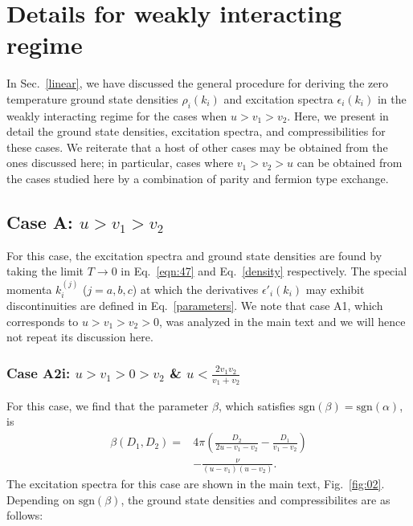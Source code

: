 \documentclass[aps,pra,
superscriptaddress,
reprint,twocolumn,preprintnumbers,
amsmath,amssymb,
nofootinbib]{revtex4-1}
\begin{document}
	 
	\section{Details for weakly interacting regime}
	\label{app:D}
	
In Sec.~\ref{linear}, we have discussed the general procedure for deriving the zero temperature ground state densities $\rho_i(k_i)$ and excitation spectra $\epsilon_i(k_i)$ in the weakly interacting regime for the cases when $u>v_1>v_2$. Here, we present in detail the ground state densities, excitation spectra, and compressibilities for these cases. We reiterate that a host of other cases may be obtained from the ones discussed here; in particular, cases where $v_1>v_2>u$ can be obtained from the cases studied here by a combination of parity and fermion type exchange. 

		\subsection{Case A: $u > v_1 > v_2$}
		\label{caseA}

For this case, the excitation spectra and ground state densities are found by taking the limit $T\to0$ in Eq.~\eqref{eqn:47} and Eq.~\eqref{density} respectively. The special momenta $k_i^{(j)}$ ($j=a,b,c$) at which the derivatives $\epsilon'_i(k_i)$ may exhibit discontinuities are defined in Eq.~\eqref{parameters}. We note that case A1, which corresponds to $u>v_1>v_2>0$, was analyzed in the main text and we will hence not repeat its discussion here. 

        \subsubsection{Case A2i: $u>v_1>0>v_2$ \& $u < \frac{2 v_1 v_2}{v_1 + v_2}$}  
        \label{sec:A2a}
For this case, we find that the parameter $\beta$, which satisfies $\text{sgn}(\beta) = \text{sgn}(\alpha)$, is  
        \begin{align}
        \beta(D_1,D_2) = &4 \pi  \left(\frac{D_2}{2 u-v_1-v_2}-\frac{D_1}{v_1-v_2}\right) \nonumber \\
        & -\frac{\nu }{\left(u-v_1\right) \left(u-v_2\right)}.
        \end{align}
The excitation spectra for this case are shown in the main text, Fig.~\ref{fig:02}. Depending on $\text{sgn}(\beta)$, the ground state densities and compressibilites are as follows: 
        
\end{document}
